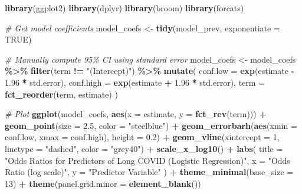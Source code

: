 \documentclass[
]{article}
\newenvironment{Shaded}{\begin{snugshade}}{\end{snugshade}}
\newcommand{\AttributeTok}[1]{\textcolor[rgb]{0.13,0.29,0.53}{#1}}
\newcommand{\CommentTok}[1]{\textcolor[rgb]{0.56,0.35,0.01}{\textit{#1}}}
\newcommand{\ConstantTok}[1]{\textcolor[rgb]{0.56,0.35,0.01}{#1}}
\newcommand{\DecValTok}[1]{\textcolor[rgb]{0.00,0.00,0.81}{#1}}
\newcommand{\FloatTok}[1]{\textcolor[rgb]{0.00,0.00,0.81}{#1}}
\newcommand{\FunctionTok}[1]{\textcolor[rgb]{0.13,0.29,0.53}{\textbf{#1}}}
\newcommand{\NormalTok}[1]{#1}
\newcommand{\OtherTok}[1]{\textcolor[rgb]{0.56,0.35,0.01}{#1}}
\newcommand{\SpecialCharTok}[1]{\textcolor[rgb]{0.81,0.36,0.00}{\textbf{#1}}}
\newcommand{\StringTok}[1]{\textcolor[rgb]{0.31,0.60,0.02}{#1}}
\begin{document}
\begin{Shaded}
\begin{Highlighting}[]
\FunctionTok{library}\NormalTok{(ggplot2)}
\FunctionTok{library}\NormalTok{(dplyr)}
\FunctionTok{library}\NormalTok{(broom)}
\FunctionTok{library}\NormalTok{(forcats)}

\CommentTok{\# Get model coefficients}
\NormalTok{model\_coefs }\OtherTok{\textless{}{-}} \FunctionTok{tidy}\NormalTok{(model\_prev, }\AttributeTok{exponentiate =} \ConstantTok{TRUE}\NormalTok{)}

\CommentTok{\# Manually compute 95\% CI using standard error}
\NormalTok{model\_coefs }\OtherTok{\textless{}{-}}\NormalTok{ model\_coefs }\SpecialCharTok{\%\textgreater{}\%}
  \FunctionTok{filter}\NormalTok{(term }\SpecialCharTok{!=} \StringTok{"(Intercept)"}\NormalTok{) }\SpecialCharTok{\%\textgreater{}\%}
  \FunctionTok{mutate}\NormalTok{(}
    \AttributeTok{conf.low =} \FunctionTok{exp}\NormalTok{(estimate }\SpecialCharTok{{-}} \FloatTok{1.96} \SpecialCharTok{*}\NormalTok{ std.error),}
    \AttributeTok{conf.high =} \FunctionTok{exp}\NormalTok{(estimate }\SpecialCharTok{+} \FloatTok{1.96} \SpecialCharTok{*}\NormalTok{ std.error),}
    \AttributeTok{term =} \FunctionTok{fct\_reorder}\NormalTok{(term, estimate)}
\NormalTok{  )}

\CommentTok{\# Plot}
\FunctionTok{ggplot}\NormalTok{(model\_coefs, }\FunctionTok{aes}\NormalTok{(}\AttributeTok{x =}\NormalTok{ estimate, }\AttributeTok{y =} \FunctionTok{fct\_rev}\NormalTok{(term))) }\SpecialCharTok{+}
  \FunctionTok{geom\_point}\NormalTok{(}\AttributeTok{size =} \FloatTok{2.5}\NormalTok{, }\AttributeTok{color =} \StringTok{"steelblue"}\NormalTok{) }\SpecialCharTok{+}
  \FunctionTok{geom\_errorbarh}\NormalTok{(}\FunctionTok{aes}\NormalTok{(}\AttributeTok{xmin =}\NormalTok{ conf.low, }\AttributeTok{xmax =}\NormalTok{ conf.high), }\AttributeTok{height =} \FloatTok{0.2}\NormalTok{) }\SpecialCharTok{+}
  \FunctionTok{geom\_vline}\NormalTok{(}\AttributeTok{xintercept =} \DecValTok{1}\NormalTok{, }\AttributeTok{linetype =} \StringTok{"dashed"}\NormalTok{, }\AttributeTok{color =} \StringTok{"grey40"}\NormalTok{) }\SpecialCharTok{+}
  \FunctionTok{scale\_x\_log10}\NormalTok{() }\SpecialCharTok{+}
  \FunctionTok{labs}\NormalTok{(}
    \AttributeTok{title =} \StringTok{"Odds Ratios for Predictors of Long COVID (Logistic Regression)"}\NormalTok{,}
    \AttributeTok{x =} \StringTok{"Odds Ratio (log scale)"}\NormalTok{,}
    \AttributeTok{y =} \StringTok{"Predictor Variable"}
\NormalTok{  ) }\SpecialCharTok{+}
  \FunctionTok{theme\_minimal}\NormalTok{(}\AttributeTok{base\_size =} \DecValTok{13}\NormalTok{) }\SpecialCharTok{+}
  \FunctionTok{theme}\NormalTok{(}\AttributeTok{panel.grid.minor =} \FunctionTok{element\_blank}\NormalTok{())}
\end{Highlighting}
\end{Shaded}
\end{document}
